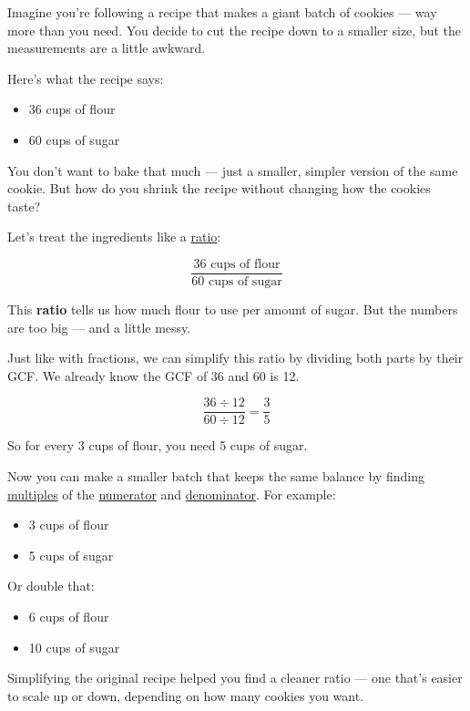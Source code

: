 \documentclass[
  letterpaper,
  DIV=11,
  numbers=noendperiod]{scrreprt}
\begin{document}
Imagine you're following a recipe that makes a giant batch of cookies
--- way more than you need. You decide to cut the recipe down to a
smaller size, but the measurements are a little awkward.

Here's what the recipe says:

\begin{itemize}
\item
  36 cups of flour
\item
  60 cups of sugar
\end{itemize}

You don't want to bake that much --- just a smaller, simpler version of
the same cookie. But how do you shrink the recipe without changing how
the cookies taste?

Let's treat the ingredients like a
\href{./glossary.html\#glossary-ratio}{ratio}:

\[
\frac{36 \text{ cups of flour}}{60 \text{ cups of sugar}}
\]

This \textbf{ratio} tells us how much flour to use per amount of sugar.
But the numbers are too big --- and a little messy.

Just like with fractions, we can simplify this ratio by dividing both
parts by their GCF. We already know the GCF of 36 and 60 is 12.

\[
\frac{36 \div 12}{60 \div 12} = \frac{3}{5}
\]

So for every 3 cups of flour, you need 5 cups of sugar.

Now you can make a smaller batch that keeps the same balance by finding
\href{./glossary.html\#glossary-multiple}{multiples} of the
\href{./glossary.html\#glossary-numerator}{numerator} and
\href{./glossary.html\#glossary-denominator}{denominator}. For example:

\begin{itemize}
\item
  3 cups of flour
\item
  5 cups of sugar
\end{itemize}

Or double that:

\begin{itemize}
\item
  6 cups of flour
\item
  10 cups of sugar
\end{itemize}

Simplifying the original recipe helped you find a cleaner ratio --- one
that's easier to scale up or down, depending on how many cookies you
want.
\end{document}
